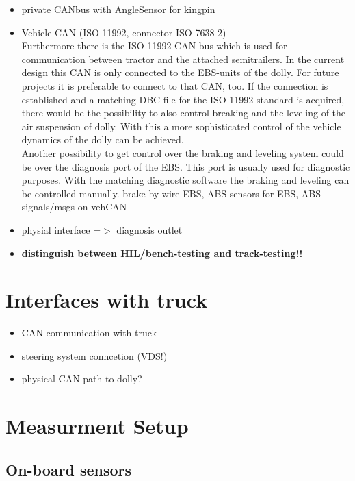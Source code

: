 \documentclass[ExampleMasters.tex]{subfiles}
\begin{document}
\begin{itemize}
	\item private CANbus with AngleSensor for kingpin\\
	\item Vehicle CAN (ISO 11992, connector ISO 7638-2) \\
	Furthermore there is the ISO 11992 CAN bus which is used for communication between tractor and the attached semitrailers. In the current design this CAN is only connected to the EBS-units of the dolly. For future projects it is preferable to connect to that CAN, too. If the connection is established and a matching DBC-file for the ISO 11992 standard is acquired, there would be the possibility to also control breaking and the leveling of the air suspension of dolly. With this a more sophisticated control of the vehicle dynamics of the dolly can be achieved.\\
	Another possibility to get control over the braking and leveling system could be over the diagnosis port of the EBS. This port is usually used for diagnostic purposes. With the matching diagnostic software the braking and leveling can be controlled manually.
	\subitem brake by-wire
	\subitem EBS, ABS
	\subitem sensors for EBS, ABS
	\subitem signals/msgs on vehCAN
	\item physial interface =$>$ diagnosis outlet
	\item \textbf{distinguish between HIL/bench-testing and track-testing!!}
\end{itemize}

\section{Interfaces with truck}
\label{sec:interface_with_truck}

\begin{itemize}
	\item CAN communication with truck
	\item steering system conncetion (VDS!)
	\item physical CAN path to dolly?

\end{itemize}


\section{Measurment Setup}
\label{sec:measurement_setup}

\subsection{On-board sensors}
\end{document}
